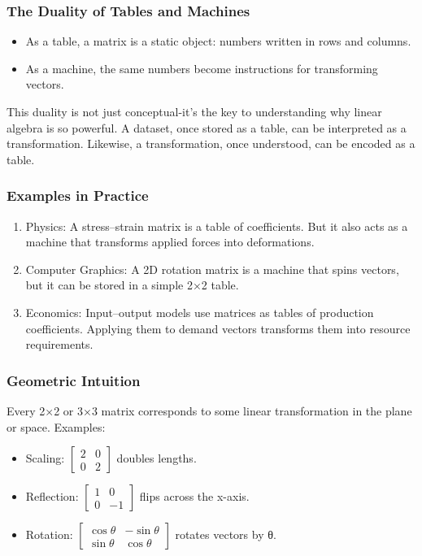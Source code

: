 \documentclass[
  letterpaper,
  DIV=11,
  numbers=noendperiod]{scrreprt}
\providecommand{\tightlist}{%
  \setlength{\itemsep}{0pt}\setlength{\parskip}{0pt}}
\begin{document}
\subsubsection{The Duality of Tables and
Machines}\label{the-duality-of-tables-and-machines}

\begin{itemize}
\tightlist
\item
  As a table, a matrix is a static object: numbers written in rows and
  columns.
\item
  As a machine, the same numbers become instructions for transforming
  vectors.
\end{itemize}

This duality is not just conceptual-it's the key to understanding why
linear algebra is so powerful. A dataset, once stored as a table, can be
interpreted as a transformation. Likewise, a transformation, once
understood, can be encoded as a table.

\subsubsection{Examples in Practice}\label{examples-in-practice}

\begin{enumerate}
\def\labelenumi{\arabic{enumi}.}
\tightlist
\item
  Physics: A stress--strain matrix is a table of coefficients. But it
  also acts as a machine that transforms applied forces into
  deformations.
\item
  Computer Graphics: A 2D rotation matrix is a machine that spins
  vectors, but it can be stored in a simple 2×2 table.
\item
  Economics: Input--output models use matrices as tables of production
  coefficients. Applying them to demand vectors transforms them into
  resource requirements.
\end{enumerate}

\subsubsection{Geometric Intuition}\label{geometric-intuition}

Every 2×2 or 3×3 matrix corresponds to some linear transformation in the
plane or space. Examples:

\begin{itemize}
\tightlist
\item
  Scaling: \(\begin{bmatrix} 2 & 0 \\ 0 & 2 \end{bmatrix}\) doubles
  lengths.
\item
  Reflection: \(\begin{bmatrix} 1 & 0 \\ 0 & -1 \end{bmatrix}\) flips
  across the x-axis.
\item
  Rotation:
  \(\begin{bmatrix} \cos θ & -\sin θ \\ \sin θ & \cos θ \end{bmatrix}\)
  rotates vectors by θ.
\end{itemize}
\end{document}
